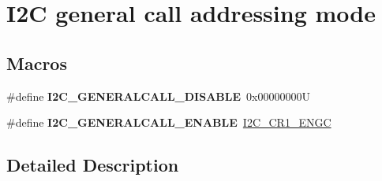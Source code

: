\hypertarget{group___i2_c__general__call__addressing__mode}{}\section{I2C general call addressing mode}
\label{group___i2_c__general__call__addressing__mode}
\subsection*{Macros}
\begin{DoxyCompactItemize}
\item 
\mbox{\label{group___i2_c__general__call__addressing__mode_ga14918ea7d2b23cd67c66b49ebbf5c0a8}} 
\#define {\bfseries I2\+C\+\_\+\+G\+E\+N\+E\+R\+A\+L\+C\+A\+L\+L\+\_\+\+D\+I\+S\+A\+B\+LE}~0x00000000U
\item 
\mbox{\label{group___i2_c__general__call__addressing__mode_ga5ec9ec869e4c78a597c5007c245c01a0}} 
\#define {\bfseries I2\+C\+\_\+\+G\+E\+N\+E\+R\+A\+L\+C\+A\+L\+L\+\_\+\+E\+N\+A\+B\+LE}~\mbox{\hyperlink{group___peripheral___registers___bits___definition_ga1d8c219193b11f8507d7b85831d14912}{I2\+C\+\_\+\+C\+R1\+\_\+\+E\+N\+GC}}
\end{DoxyCompactItemize}


\subsection{Detailed Description}

